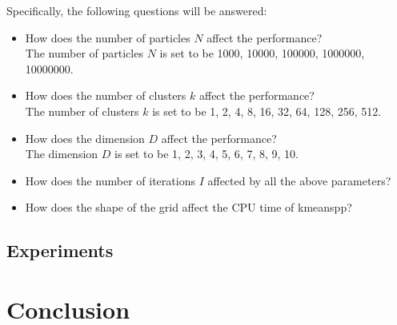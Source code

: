 \documentclass[12pt]{article}
\begin{document}

Specifically, the following questions will be answered:

\begin{itemize}
    \item How does the number of particles $N$ affect the performance?
\\The number of particles $N$ is set to be 1000, 10000, 100000, 1000000, 10000000.
    \item How does the number of clusters $k$ affect the performance?
\\The number of clusters $k$ is set to be 1, 2, 4, 8, 16, 32, 64, 128, 256, 512.
    \item How does the dimension $D$ affect the performance?
\\The dimension $D$ is set to be 1, 2, 3, 4, 5, 6, 7, 8, 9, 10.
    \item How does the number of iterations $I$ affected by all the above parameters?

  \item How does the shape of the grid affect the CPU time of kmeanspp?
\end{itemize}



\subsection{Experiments}



\section{Conclusion}

%
%
\end{document}
